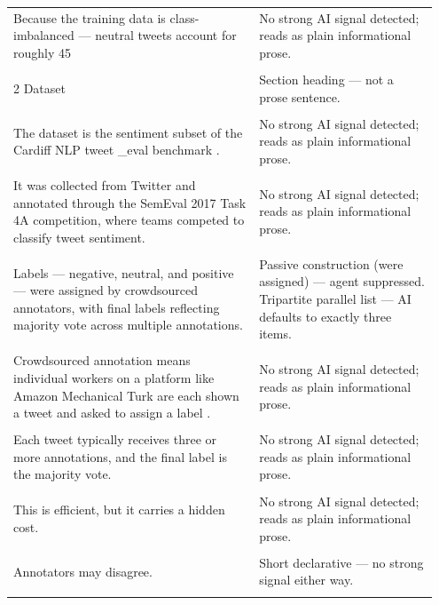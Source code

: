 \documentclass[11pt]{article}
\begin{document}
\begin{longtable}{|p{0.55\linewidth}|p{0.40\linewidth}|}
\hline
\rule{0pt}{3.5cm} & \\
\hline
Because the training data is class-imbalanced --- neutral tweets account for roughly 45 & No strong AI signal detected; reads as plain informational prose. \\[2pt]
\hline
\rule{0pt}{3.5cm} & \\
\hline
2 Dataset & Section heading --- not a prose sentence. \\[2pt]
\hline
\rule{0pt}{3.5cm} & \\
\hline
The dataset is the sentiment subset of the Cardiff NLP tweet \_eval benchmark . & No strong AI signal detected; reads as plain informational prose. \\[2pt]
\hline
\rule{0pt}{3.5cm} & \\
\hline
It was collected from Twitter and annotated through the SemEval 2017 Task 4A competition, where teams competed to classify tweet sentiment. & No strong AI signal detected; reads as plain informational prose. \\[2pt]
\hline
\rule{0pt}{3.5cm} & \\
\hline
Labels --- negative, neutral, and positive --- were assigned by crowdsourced annotators, with final labels reflecting majority vote across multiple annotations. & Passive construction (were assigned) --- agent suppressed. Tripartite parallel list --- AI defaults to exactly three items. \\[2pt]
\hline
\rule{0pt}{3.5cm} & \\
\hline
Crowdsourced annotation means individual workers on a platform like Amazon Mechanical Turk are each shown a tweet and asked to assign a label . & No strong AI signal detected; reads as plain informational prose. \\[2pt]
\hline
\rule{0pt}{3.5cm} & \\
\hline
Each tweet typically receives three or more annotations, and the final label is the majority vote. & No strong AI signal detected; reads as plain informational prose. \\[2pt]
\hline
\rule{0pt}{3.5cm} & \\
\hline
This is efficient, but it carries a hidden cost. & No strong AI signal detected; reads as plain informational prose. \\[2pt]
\hline
\rule{0pt}{3.5cm} & \\
\hline
Annotators may disagree. & Short declarative --- no strong signal either way. \\[2pt]
\hline
\rule{0pt}{3.5cm} & \\

\end{longtable}
\end{document}
